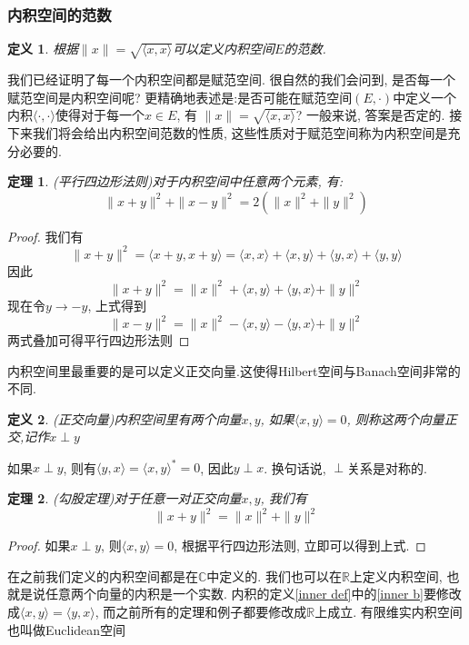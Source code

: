\documentclass[a4paper,11pt]{book}
\newtheorem{definition}{\hspace{2em}定义}[section]
\newtheorem{theorem}{\hspace{2em}定理}[section]
\newtheorem{proof}{证明}[section]
\begin{document}
\subsubsection*{内积空间的范数}
\begin{definition}
  根据$\|x\|=\sqrt{\langle x,x\rangle}$可以定义内积空间$E$的范数.
\end{definition}
我们已经证明了每一个内积空间都是赋范空间. 很自然的我们会问到, 是否每一个赋范空间是内积空间呢? 更精确地表述是:是否可能在赋范空间$(E,\cdot)$中定义一个内积$\langle\cdot,\cdot\rangle$使得对于每一个$x\in E$, 有 $\|x\|=\sqrt{\langle x,x\rangle}$? 一般来说, 答案是否定的. 接下来我们将会给出内积空间范数的性质, 这些性质对于赋范空间称为内积空间是充分必要的.
\begin{theorem}
  (平行四边形法则)对于内积空间中任意两个元素, 有:
  \begin{equation*}
    \|x+y\|^2+\|x-y\|^2=2(\|x\|^2+\|y\|^2)
  \end{equation*}
\end{theorem}
\begin{proof}
  我们有
  \begin{equation*}
    \|x+y\|^2=\langle x+y,x+y\rangle=\langle x,x\rangle+\langle x,y\rangle+\langle y,x\rangle+\langle y,y\rangle
  \end{equation*}
  因此
  \begin{equation*}
    \|x+y\|^2=\|x\|^2+\langle x,y\rangle+\langle y,x\rangle+\|y\|^2
  \end{equation*}
  现在令$y\to -y$, 上式得到
  \begin{equation*}
    \|x-y\|^2=\|x\|^2-\langle x,y\rangle-\langle y,x\rangle+\|y\|^2
  \end{equation*}
  两式叠加可得平行四边形法则
\end{proof}
内积空间里最重要的是可以定义正交向量.这使得Hilbert空间与Banach空间非常的不同.
\begin{definition}
  (正交向量)内积空间里有两个向量$x,y$, 如果$\langle x,y\rangle=0$, 则称这两个向量正交,记作$x\perp y$
\end{definition}
如果$x\perp y$, 则有$\langle y,x\rangle=\langle x,y\rangle^*=0$, 因此$y\perp x$. 换句话说, $\perp$关系是对称的.
\begin{theorem}
  (勾股定理)对于任意一对正交向量$x,y$, 我们有
  \begin{equation*}
    \|x+y\|^2=\|x\|^2+\|y\|^2
  \end{equation*}
\end{theorem}
\begin{proof}
  如果$x\perp y$, 则$\langle x,y\rangle=0$, 根据平行四边形法则, 立即可以得到上式.
\end{proof}
在之前我们定义的内积空间都是在$\mathbb{C}$中定义的. 我们也可以在$\mathbb{R}$上定义内积空间, 也就是说任意两个向量的内积是一个实数. 内积的定义\ref{inner def}中的\ref{inner b}要修改成$\langle x,y\rangle=\langle y,x\rangle$, 而之前所有的定理和例子都要修改成$\mathbb{R}$上成立. 有限维实内积空间也叫做Euclidean空间
\end{document}

